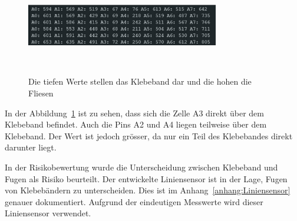 \documentclass[main.tex]{subfiles} %
\begin{document}
\begin{figure}[H]
    \centering
    \includegraphics[width=0.75\textwidth]{fig_Strecke_Tracken/Auswertung_Strecke.pdf}
    \caption{Die tiefen Werte stellen das Klebeband dar und die hohen die Fliesen}~\label{fig:Auswertung_Strecke_Beispiel}
\end{figure}

In der Abbildung~\ref{fig:Auswertung_Strecke_Beispiel} ist zu sehen, dass sich
die Zelle A3 direkt über dem Klebeband befindet. Auch die Pins A2 und A4 liegen
teilweise über dem Klebeband. Der Wert ist jedoch grösser, da nur ein Teil des
Klebebandes direkt darunter liegt.

In der Risikobewertung wurde die Unterscheidung zwischen Klebeband und Fugen
als Risiko beurteilt. Der entwickelte Liniensensor ist in der Lage, Fugen von
Klebebändern zu unterscheiden. Dies ist im Anhang~\ref{anhang:Liniensensor}
genauer dokumentiert. Aufgrund der eindeutigen Messwerte wird dieser
Liniensensor verwendet.
\end{document}
